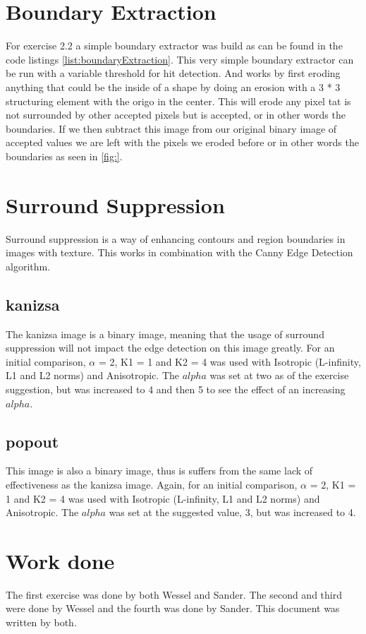 \documentclass[10pt,a4paper]{article}
\begin{document}
\section{Boundary Extraction}
For exercise 2.2 a simple boundary extractor was build as can be found in the code listings \ref{list:boundaryExtraction}. This very simple boundary extractor can be run with a variable threshold for hit detection. And works by first eroding anything that could be the inside of a shape by doing an erosion with a 3 * 3 structuring element with the origo in the center. This will erode any pixel tat is not surrounded by other accepted pixels but is accepted, or in other words the boundaries. If we then subtract this image from our original binary image of accepted values we are left with the pixels we eroded before or in other words the boundaries as seen in \ref{fig:}.


\section{Surround Suppression}
Surround suppression is a way of enhancing contours and region boundaries in images with texture. This works in combination with the Canny Edge Detection algorithm.

\subsection{kanizsa}
The kanizsa image is a binary image, meaning that the usage of surround suppression will not impact the edge detection on this image greatly.
For an initial comparison, $\alpha$ = 2, K1 = 1 and K2 = 4 was used with Isotropic (L-infinity, L1 and L2 norms) and Anisotropic. The $alpha$ was set at two as of the exercise suggestion, but was increased to 4 and then 5 to see the effect of an increasing $alpha$.

\subsection{popout}
This image is also a binary image, thus is suffers from the same lack of effectiveness as the kanizsa image.
Again, for an initial comparison, $\alpha$ = 2, K1 = 1 and K2 = 4 was used with Isotropic (L-infinity, L1 and L2 norms) and Anisotropic. The $alpha$ was set at the suggested value, 3, but was increased to 4.

\section{Work done}
The first exercise was done by both Wessel and Sander. The second and third were done by Wessel and the fourth was done by Sander.
This document was written by both.
\end{document}

